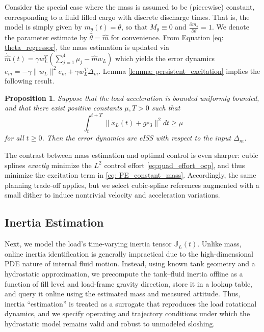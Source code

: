 \documentclass[letterpaper, 10 pt, conference]{ieeeconf}  %
\newcounter{part} %
\newtheorem{proposition}{Proposition}[section]
\begin{document}
Consider the special case where the mass is assumed to be (piecewise) constant, corresponding to a fluid filled cargo with discrete discharge times. That is, the model is simply given by $m_\theta(t) = \theta$, so that $M_\theta \equiv 0$ and $\displaystyle \frac{\partial m_\theta}{\partial \theta} = 1$. We denote the parameter estimate by $\hat{\theta} = \hat{m}$ for convenience. From Equation \eqref{eq: theta_regressor}, the mass estimation is updated via $\displaystyle{\dot{\hat{m}}(t) = \gamma w_L^T \left(\sum_{j=1}^4 \mu_j - \hat{m}w_L \right)}$
which yields the error dynamics $\dot{e}_m = -\gamma \|w_L\|^2 e_m + \gamma w_L^T \Delta_m$.
Lemma \ref{lemma: persistent_excitation} implies the following result.
\begin{proposition}
    Suppose that the load acceleration is bounded uniformly bounded, and  that there exist positive constants $\mu, T > 0$ such that
    \begin{equation}\label{eq: PE_constant_mass}
        \int_t^{t+T} \|\ddot{x}_L(t) + ge_3\|^2 dt \ge \mu
    \end{equation}
    for all $t \ge 0$. Then the error dynamics are eISS with respect to the input $\Delta_m$.
\end{proposition}

The contrast between mass estimation and optimal control is even sharper: cubic splines \emph{exactly} minimize the $L^2$ control effort \eqref{eq:quad_effort_ocp}, and thus minimize the excitation term in \eqref{eq: PE_constant_mass}. Accordingly, the same planning trade-off applies, but we select cubic-spline references augmented with a small dither to induce nontrivial velocity and acceleration variations.

\subsection{Inertia Estimation}
Next, we model the load’s time-varying inertia tensor $\mathbb{J}_L(t)$. Unlike mass, online inertia identification is generally impractical due to the high-dimensional PDE nature of internal fluid motion. Instead, using known tank geometry and a hydrostatic approximation, we precompute the tank–fluid inertia offline as a function of fill level and load-frame gravity direction, store it in a lookup table, and query it online using the estimated mass and measured attitude. Thus, inertia “estimation” is treated as a surrogate that reproduces the load rotational dynamics, and we specify operating and trajectory conditions under which the hydrostatic model remains valid and robust to unmodeled sloshing.
\end{document}
